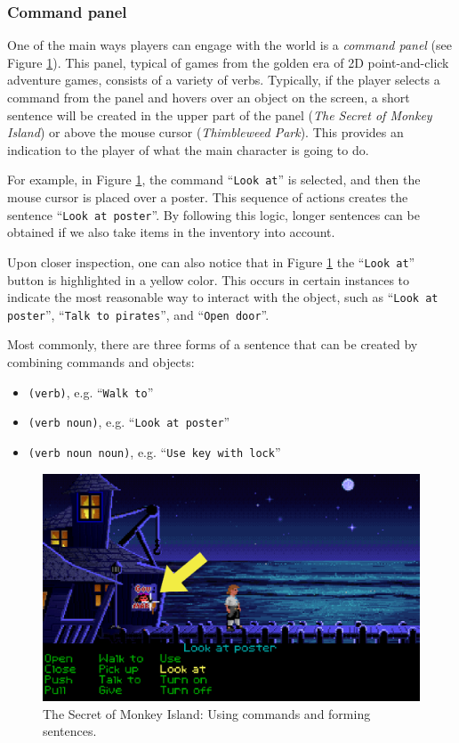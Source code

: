 \subsubsection{Command panel}
One of the main ways players can engage with the world is a \textit{command panel} (see Figure \ref{fig:C-TSoMI}). This panel, typical of games from the golden era of 2D point-and-click adventure games, consists of a variety of verbs. Typically, if the player selects a command from the panel and hovers over an object on the screen, a short sentence will be created in the upper part of the panel (\textit{The Secret of Monkey Island}) or above the mouse cursor (\textit{Thimbleweed Park}). This provides an indication to the player of what the main character is going to do. 

For example, in Figure \ref{fig:C-TSoMI}, the command “\texttt{Look at}” is selected, and then the mouse cursor is placed over a poster. This sequence of actions creates the sentence “\texttt{Look at poster}”. By following this logic, longer sentences can be obtained if we also take items in the inventory into account. 

Upon closer inspection, one can also notice that in Figure \ref{fig:C-TSoMI} the “\texttt{Look at}” button is highlighted in a yellow color. This occurs in certain instances to indicate the most reasonable way to interact with the object, such as “\texttt{Look at poster}”, “\texttt{Talk to pirates}”, and “\texttt{Open door}”.

Most commonly, there are three forms of a sentence that can be created by combining commands and objects:
\begin{itemize}
    \item \verb|(verb)|, e.g. “\texttt{Walk to}”
    \item \verb|(verb noun)|, e.g. “\texttt{Look at poster}”
    \item \verb|(verb noun noun)|, e.g. “\texttt{Use key with lock}”
\end{itemize}

\begin{figure}[H]
\centering
\includegraphics[width=.8\linewidth]{img/C-TSoMI.png}
\caption{The Secret of Monkey Island: Using commands and forming sentences.}
\label{fig:C-TSoMI}
\end{figure}
 
